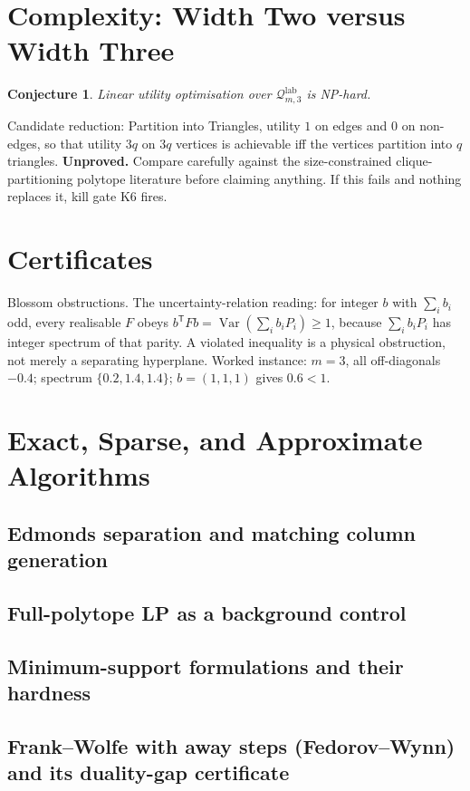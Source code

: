 \documentclass[11pt]{article}
\newtheorem{conjecture}{Conjecture}
\begin{document}
\section{Complexity: Width Two versus Width Three}
\begin{conjecture}
Linear utility optimisation over $\mathcal Q^{\mathrm{lab}}_{m,3}$ is NP-hard.
\end{conjecture}
Candidate reduction: Partition into Triangles, utility $1$ on edges and $0$ on non-edges, so
that utility $3q$ on $3q$ vertices is achievable iff the vertices partition into $q$
triangles. \textbf{Unproved.} Compare carefully against the size-constrained
clique-partitioning polytope literature before claiming anything. If this fails and nothing
replaces it, kill gate K6 fires.

\section{Certificates}
Blossom obstructions. The uncertainty-relation reading: for integer $b$ with $\sum_ib_i$ odd,
every realisable $F$ obeys $b^{\mathsf T}Fb=\operatorname{Var}(\sum_ib_iP_i)\ge1$, because
$\sum_ib_iP_i$ has integer spectrum of that parity. A violated inequality is a physical
obstruction, not merely a separating hyperplane. Worked instance: $m=3$, all off-diagonals
$-0.4$; spectrum $\{0.2,1.4,1.4\}$; $b=(1,1,1)$ gives $0.6<1$.

\section{Exact, Sparse, and Approximate Algorithms}
\subsection{Edmonds separation and matching column generation}
\subsection{Full-polytope LP as a background control}
\subsection{Minimum-support formulations and their hardness}
\subsection{Frank--Wolfe with away steps (Fedorov--Wynn) and its duality-gap certificate}
\end{document}
